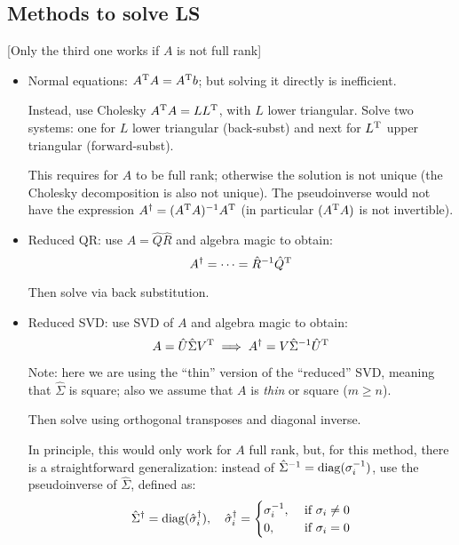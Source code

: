 \documentclass[
  12pt,
  paper=a4,
]{scrartcl} %
\begin{document}
\subsection*{Methods to solve LS}
[Only the third one works if $A$ is not full rank]

\begin{itemize}
    \item Normal equations: $A^{\mathrm{T}} A=A^{\mathrm{T}} b$; but solving it directly is inefficient.
    
    Instead, use Cholesky $A^{\mathrm{T}} A = L L^{\mathrm{T}}$, with $L$ lower triangular. Solve two systems: one for $L$ lower triangular (back-subst) and next for $L^{\mathrm{T}}$ upper triangular (forward-subst).
    
    This requires for $A$ to be full rank; otherwise the solution is not unique (the Cholesky decomposition is also not unique). The pseudoinverse would not have the expression $A^\dagger = (A^{\mathrm{T}} A)^{-1}A^{\mathrm{T}}$ (in particular $(A^{\mathrm{T}} A)$ is not invertible).
    
    \item Reduced QR: use $A=\hat{Q}\hat{R}$ and algebra magic to obtain:
    \[A^\dagger = \cdots = \hat R^{-1}\hat Q^{\mathrm{T}}\]
    
    Then solve via back substitution.
    
    \item Reduced SVD: use SVD of $A$ and algebra magic to obtain:
    \[
    A =\hat U\hat\Sigma V^{\mathrm{T}}
    \implies
    A^\dagger = V\hat\Sigma^{-1}\hat U^{\mathrm{T}}\]
    
    Note: here we are using the ``thin'' version of the ``reduced'' SVD, meaning that $\hat\Sigma$ is square; also we assume that $A$ is \emph{thin} or square ($m\ge n$).
    
    Then solve using orthogonal transposes and diagonal inverse.

    In principle, this would only work for $A$ full rank, but, for this method, there is a straightforward generalization: instead of $\hat \Sigma^{-1} = \operatorname{diag}(\sigma_i^{-1})$, use the pseudoinverse of $\hat\Sigma$, defined as:
    \[
        \hat\Sigma^{\dagger} = \operatorname{diag}(\hat\sigma^{\dagger}_i)
        ,\quad
        \hat\sigma^{\dagger}_i =
        \begin{cases}
         \sigma_i^{-1}, & \text{ if } \sigma_i\neq 0\\
         0, & \text{ if } \sigma_i = 0
        \end{cases}
    \]

    
    

\end{itemize}
\end{document}
